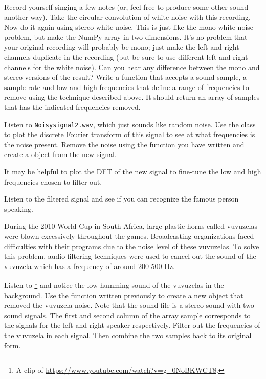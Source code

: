 Record yourself singing a few notes (or, feel free to produce some other sound another way).
Take the circular convolution of white noise with this recording.
Now do it again using stereo white noise.
This is just like the mono white noise problem, but make the NumPy array in two dimensions.
It's no problem that your original recording will probably be mono; just make the left and right channels duplicate in the recording (but be sure to use different left and right channels for the white noise).
Can you hear any difference between the mono and stereo versions of the result?
Write a function that accepts a sound sample, a sample rate and low and high frequencies that define a range of frequencies to remove using the technique described above. 
It should return an array of samples that has the indicated frequencies removed. 

Listen to \texttt{Noisysignal2.wav}, which just sounds like random noise. 
Use the  class to plot the discrete Fourier transform of this signal to see at what frequencies is the noise present. 
Remove the noise using the function you have written and create a  object from the new signal. 

It may be helpful to plot the DFT of the new signal to fine-tune the low and high frequencies chosen to filter out. 

Listen to the filtered signal and see if you can recognize the famous person speaking. 

During the 2010 World Cup in South Africa, large plastic horns called vuvuzelas were blown excessively throughout the games.
Broadcasting organizations faced difficulties with their programs due to the noise level of these vuvuzelas. 
To solve this problem, audio filtering techniques were used to cancel out the sound of the vuvuzela which has a frequency of around 200-500 Hz. 

Listen to \footnote{A clip of \url{https://www.youtube.com/watch?v=g_0NoBKWCT8}.} and notice the low humming sound of the vuvuzelas in the background.  
Use the function written previously to create a new  object that removed the vuvuzela noise. 
Note that the sound file is a stereo sound with two sound signals. 
The first and second column of the array sample corresponds to the signals for the left and right speaker respectively.  
Filter out the frequencies of the vuvuzela in each signal. 
Then combine the two samples back to its original form. 

